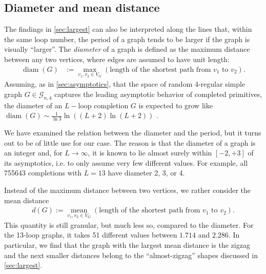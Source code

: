 \documentclass[11pt,a4paper]{article}
\newcommand{\diam}{\operatorname{diam}}
\renewcommand{\|}{\rule[-0.4ex]{0.2ex}{1.2em}}
\begin{document}
\subsection{Diameter and mean distance}\label{sec:diameter}


The findings in \cref{sec:largest} can also be interpreted along the lines that, within the same loop number, the period of a graph tends to be larger if the graph is visually  \enquote{larger}. 
The \emph{diameter} of a graph is defined as the maximum distance between any two vertices, where edges are assumed to have unit length:
\begin{align*}
\diam(G) &:= \max_{v_1,v_2\in V_G} \left( \text{length of the shortest path from $v_1$ to $v_2$} \right) .
\end{align*}
Assuming, as  in \cref{sec:asymptotics}, that the space of random 4-regular simple graph $G\in \mathcal G_{n,4}$ captures the leading asymptotic behavior of completed primitives, the diameter of an $L-$loop completion $G$ is expected to grow like $\diam(G)\sim \frac{1}{\ln 3} \ln \left( (L+2)\ln (L+2) \right) $  \cite{bollobas_diameter_1982}.


We have examined the relation between the diameter and the period, but it turns out to be of little use for our case. The reason is that  the diameter of a graph is an integer and, for $L \rightarrow \infty$, it is known to lie almost surely within $[-2,+3]$ of its asymptotics, i.e. to only assume very few different values. For example, all 755643 completions with $L=13$ have diameter 2, 3, or 4. 

Instead of the maximum distance between two vertices, we rather consider the mean distance
\begin{align*}
d (G) := \underset{v_1,v_2 \in V_G}{\operatorname{mean}}\left( \text{length of the shortest path from $v_1$ to $v_2$} \right) .
\end{align*}
This quantity is still granular, but much less so, compared to the diameter. For the 13-loop graphs, it takes 51 different values between $1.714$ and $2.286$. In particular, we find that the graph with the largest mean distance is the zigzag and the next smaller distances belong to the \enquote{almost-zigzag} shapes discussed in \cref{sec:largest}. 
\end{document}
